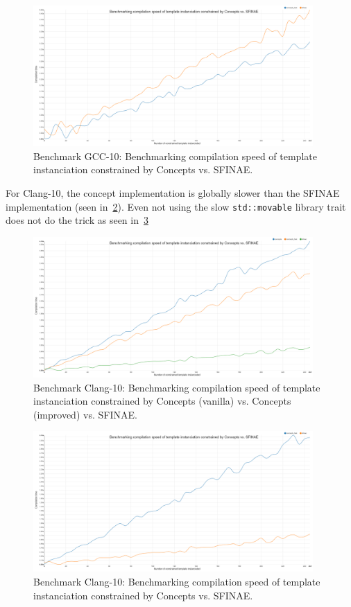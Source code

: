 \begin{figure}[htb]
  \centering
  \includegraphics[width=4.2in]{figs/compile_time_benches/gcc10/chart.concept2.png}
  \caption{Benchmark GCC-10: Benchmarking compilation speed of template instanciation constrained by Concepts vs. SFINAE.}
  \label{fig:gen.bench.gcc10.2.concept.sfinae}
\end{figure}

For Clang-10, the concept implementation is globally slower than the SFINAE implementation (seen
in~\cref{fig:gen.bench.clang10.1.concept.sfinae}). Even not using the slow \texttt{std::movable} library trait does not
do the trick as seen in~\cref{fig:gen.bench.clang10.2.concept.sfinae}

\begin{figure}[htb]
  \centering
  \includegraphics[width=4.2in]{figs/compile_time_benches/clang10/chart.concept.png}
  \caption{Benchmark Clang-10: Benchmarking compilation speed of template instanciation constrained by Concepts (vanilla) vs. Concepts (improved) vs. SFINAE.}
  \label{fig:gen.bench.clang10.1.concept.sfinae}
\end{figure}

\begin{figure}[htb]
  \centering
  \includegraphics[width=4.2in]{figs/compile_time_benches/clang10/chart.concept2.png}
  \caption{Benchmark Clang-10: Benchmarking compilation speed of template instanciation constrained by Concepts vs. SFINAE.}
  \label{fig:gen.bench.clang10.2.concept.sfinae}
\end{figure}

